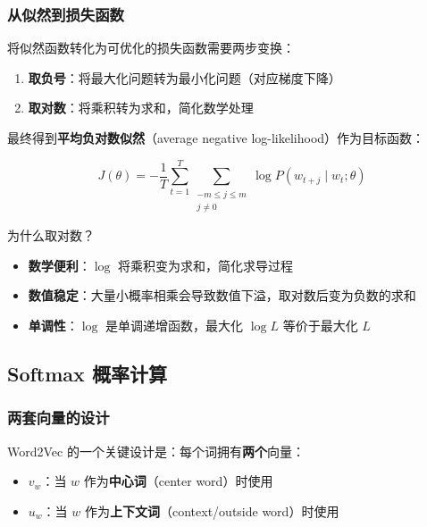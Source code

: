 \documentclass[a4paper]{article}
\begin{document}
\subsubsection{从似然到损失函数}

将似然函数转化为可优化的损失函数需要两步变换：

\begin{enumerate}
    \item \textbf{取负号}：将最大化问题转为最小化问题（对应梯度下降）
    \item \textbf{取对数}：将乘积转为求和，简化数学处理
\end{enumerate}

最终得到\textbf{平均负对数似然}（average negative log-likelihood）作为目标函数：

$$J(\theta) = -\frac{1}{T} \sum_{t=1}^{T} \sum_{\substack{-m \le j \le m \\ j \ne 0}} \log P(w_{t+j} \mid w_t; \theta)$$





\begin{knowledgebox}{为什么取对数？}
\begin{itemize}
    \item \textbf{数学便利}：$\log$ 将乘积变为求和，简化求导过程
    \item \textbf{数值稳定}：大量小概率相乘会导致数值下溢，取对数后变为负数的求和
    \item \textbf{单调性}：$\log$ 是单调递增函数，最大化 $\log L$ 等价于最大化 $L$
\end{itemize}
\end{knowledgebox}

\subsection{Softmax 概率计算}

\subsubsection{两套向量的设计}

Word2Vec 的一个关键设计是：每个词拥有\textbf{两个}向量：

\begin{itemize}
    \item $v_w$：当 $w$ 作为\textbf{中心词}（center word）时使用
    \item $u_w$：当 $w$ 作为\textbf{上下文词}（context/outside word）时使用
\end{itemize}
\end{document}
